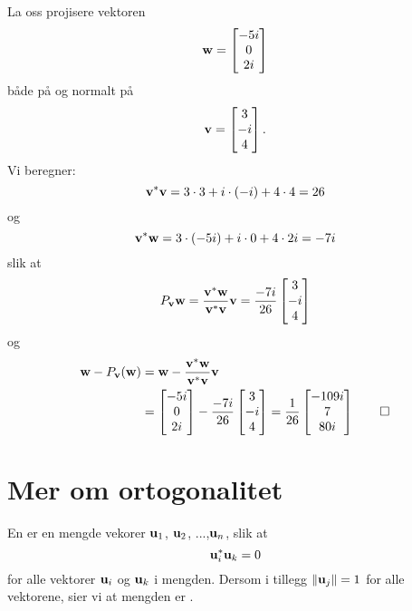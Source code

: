 \begin{ex}
La oss projisere vektoren 
\[
\mathbf{w}=
\begin{bmatrix}
 -5i  \\
 0  \\
2i 
\end{bmatrix}
\]
både på og normalt på
\[
\mathbf{v}=
\begin{bmatrix}
 3 \\
 -i \\
 4
\end{bmatrix}.
\]
Vi beregner:
\[
\mathbf{v}^* \mathbf{v}=3\cdot 3+i\cdot (-i)+4\cdot 4=26
\]
og
\[
\mathbf{v}^* \mathbf{w} = 3 \cdot (-5i) + i \cdot 0 + 4 \cdot 2i = -7i
\]
slik at
\begin{align*}
P_{\mathbf{v}}\mathbf{w} =\frac{ \mathbf{v}^*\mathbf{w}}{\mathbf{v}^* \mathbf{v}} \mathbf{v} =
\frac{-7i}{26}
\begin{bmatrix}
 3 \\
 -i \\
 4
\end{bmatrix}
\end{align*}
og 
\begin{align*}
 \mathbf{w}-P_{\mathbf{v}}(\mathbf{w})&=\mathbf{w}-\frac{ \mathbf{v}^*\mathbf{w}}{\mathbf{v}^* \mathbf{v}} \mathbf{v} \\&= 
\begin{bmatrix}
 -5i  \\
 0  \\
2i 
\end{bmatrix}
-
\frac{-7i}{26}
\begin{bmatrix}
 3 \\
 -i \\
 4
\end{bmatrix}
=
\frac{1}{26}
\begin{bmatrix}
 -109i \\
 7 \\
 80i
\end{bmatrix}\qedhere
\end{align*} 
\end{ex}


\section*{Mer om ortogonalitet}
\begin{defnx}
En  er en mengde vekorer $\mathbf{u}_1$, $\mathbf{u}_2$, ...,$\mathbf{u}_n$, slik at
\[
\mathbf{u}_i^*  \mathbf{u}_k = 0
\]
for alle vektorer $\mathbf{u}_i$ og $\mathbf{u}_k$ i mengden. Dersom i tillegg $\|\mathbf{u}_j \|=1$ for alle vektorene, sier vi at mengden er .
\end{defnx}


